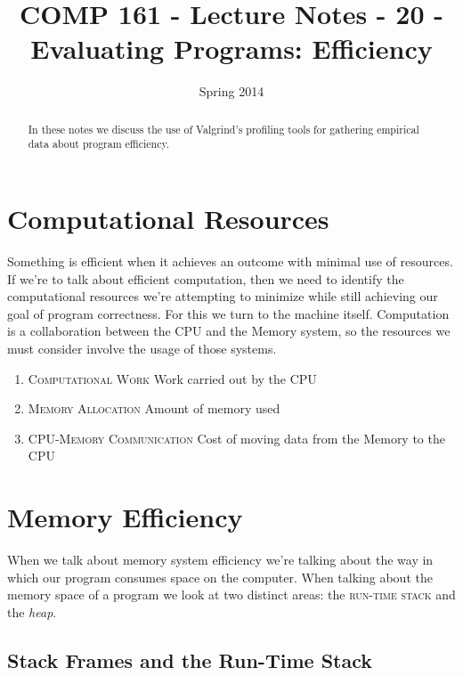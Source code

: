 \documentclass[]{tufte-handout}
\title{COMP 161 - Lecture Notes - 20 - Evaluating Programs: Efficiency}
\date{Spring 2014}
\begin{document}
 
\maketitle

\begin{abstract}
In these notes we discuss the use of Valgrind's profiling tools for gathering empirical data about program efficiency.
\end{abstract}

\section{Computational Resources}

Something is efficient when it achieves an outcome with minimal use of resources.  If we're to talk about efficient computation, then we need to identify the computational resources we're attempting to minimize while still achieving our goal of program correctness.  For this we turn to the machine itself. Computation is a collaboration between the CPU and the Memory system, so the resources we must consider involve the usage of those systems.
\begin{enumerate}
\item \textsc{Computational Work} Work carried out by the CPU
\item \textsc{Memory Allocation} Amount of memory used  
\item \textsc{CPU-Memory Communication} Cost of moving data from the Memory to the CPU
\end{enumerate}

\section{Memory Efficiency}

When we talk about memory system efficiency we're talking about the way in which our program consumes space on the computer.  When talking about the memory space of a program we look at two distinct areas: the \textsc{run-time stack} and the \textit{heap}.  

\subsection{Stack Frames and the Run-Time Stack}
\end{document}
